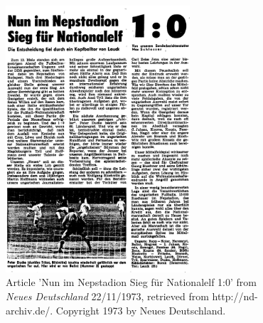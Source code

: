 \documentclass[unknownkeysallowed,usepdftitle=false,aspectratio=169, parskip=full]{beamer}
\newcommand{\secvariable}{nothing}
\newcommand{\mysection}[1]{\renewcommand{\secvariable}{#1}
}
\begin{document}
\mysection{slab}
\begin{frame}\label{\secvariable}
  \begin{columns}[t]
  \begin{column}[c]{0.45\textwidth}
\begin{figure}[h]
\centering
\includegraphics[width=0.7\textwidth,height=0.7\textheight,keepaspectratio]{figure/nun.png}
\caption{Article 'Nun im Nepstadion Sieg für Nationalelf 1:0' from \textit{Neues Deutschland} 22/11/1973, retrieved from http://nd-archiv.de/. Copyright 1973 by Neues Deutschland.}
\end{figure}
    \end{column}
    \begin{column}[c]{0.45\textwidth}
    \begin{figure}[h]
\centering

\end{figure}
\end{column}
\end{columns}
\end{frame}
\end{document}
